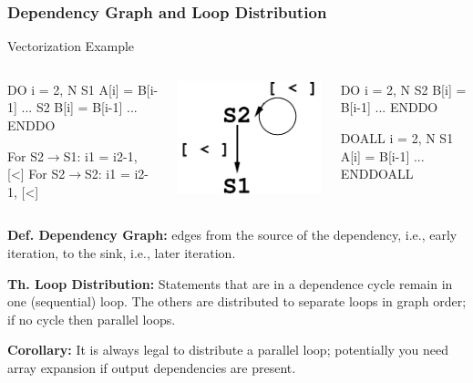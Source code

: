 \documentclass{beamer}
\newcommand{\emp}[1]{\textcolor{DikuRed}{ #1}}
\newcommand{\emphh}[1]{\textcolor{CosGreen}{ #1}}
\newcommand{\mymath}[1]{$ #1 $}
\begin{document}
\begin{frame}[fragile,t]
  \frametitle{Dependency Graph and Loop Distribution} %

\begin{block}{Vectorization Example}
\begin{columns}
\begin{colorcode}[fontsize=\scriptsize]
  DO i = 2, N
\emp{S1  A[i] = B[i-1] ...}
\alert{S2  B[i] = B[i-1] ...}
  ENDDO  

For S2\mymath{\rightarrow}S1: i1 = i2-1, \emp{[<]}
For S2\mymath{\rightarrow}S2: i1 = i2-1, \emp{[<]}
\end{colorcode} 
\includegraphics[height=12ex]{ParTeaserFigs/LoopDistr}  
\begin{colorcode}[fontsize=\scriptsize]
  \alert{DO} i = 2, N
S2  B[i] = B[i-1] ...
  \alert{ENDDO}

  \emphh{DOALL} i = 2, N
\emp{S1  A[i] = B[i-1] ...}
  \emphh{ENDDOALL}
\end{colorcode}
\end{columns}
\end{block}

\smallskip

{\bf Def. Dependency Graph:} edges from the source of the dependency, i.e., early iteration, 
to the sink, i.e., later iteration. 

\pause\smallskip

{\bf Th. Loop Distribution:} Statements that are in a dependence cycle remain in one 
(sequential) loop.   The others are distributed to separate loops in graph order; 
if no cycle then parallel loops.

\bigskip

{\bf Corollary:} It is always legal to distribute a parallel loop; potentially you need
array expansion if output dependencies are present.
\end{frame}
\end{document}
